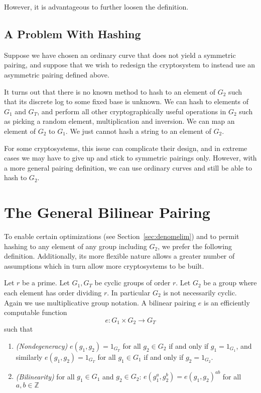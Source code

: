 However, it is advantageous to further loosen the definition.

\subsection{A Problem With Hashing}

Suppose we have chosen an ordinary curve that does not yield a symmetric
pairing, and suppose that we wish to redesign the cryptosystem to instead use
an asymmetric pairing defined above.

It turns out that there is no known method to hash to an element of $G_2$ such
that its discrete log to some fixed base is unknown. We can hash to elements of
$G_1$ and $G_T$, and perform all other cryptographically useful operations in
$G_2$ such as picking a random element, multiplication and inversion. We can
map an element of $G_2$ to $G_1$. We just cannot hash a string to an element of
$G_2$.

For some cryptosystems, this issue can complicate their design, and in extreme
cases we may have to give up and stick to symmetric pairings only. However,
with a more general pairing definition, we can use ordinary curves and still be
able to hash to $G_2$.

\section{\label{sec:generalpairing}The General Bilinear Pairing}

To enable certain optimizations (see Section~\ref{sec:denomelim}) and
to permit hashing to any element of any group including $G_2$,
we prefer the following definition. Additionally, its more flexible nature
allows a greater number of assumptions which in turn allow more
cryptosystems to be built.

Let $r$ be a prime.
Let $G_1, G_T$ be cyclic groups of order $r$.
Let $G_2$ be a group where each element has order dividing $r$.
In particular $G_2$ is not necessarily cyclic.
Again we use multiplicative group notation.
A bilinear pairing $e$ is an efficiently computable function
\[
e:G_1 \times G_2 \rightarrow G_T
\]
such that
\begin{enumerate}
\item
\emph{(Nondegeneracy)}
$e(g_1,g_2) = 1_{G_T}$ for all $g_2 \in G_2$ if and only if $g_1 = 1_{G_1}$,
and similarly 
$e(g_1,g_2) = 1_{G_T}$ for all $g_1 \in G_1$ if and only if $g_2 = 1_{G_2}$.
\item
\emph{(Bilinearity)}
for all $g_1 \in G_1$ and $g_2 \in G_2$:
$e(g_1^a, g_2^b) = e(g_1,g_2)^{a b}$ for all $a, b \in \mathbb{Z}$
\end{enumerate}

